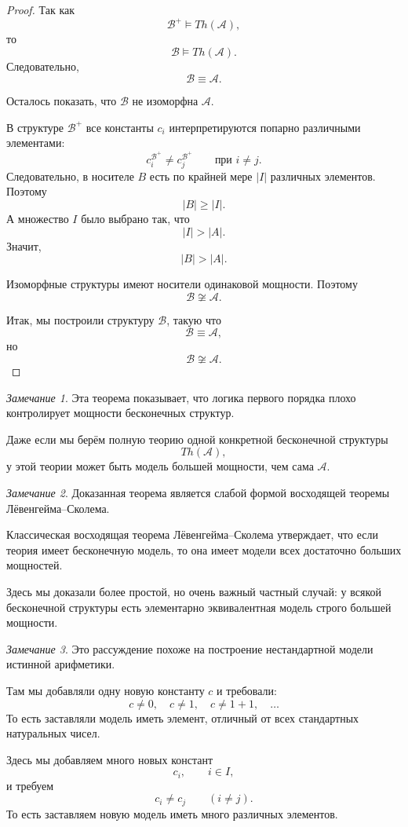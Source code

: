 \documentclass[12pt,a4paper,oneside,openany]{book}
\theoremstyle{definition}
\theoremstyle{plain}
\theoremstyle{remark}
\newtheorem{remark}{Замечание}[chapter]
\begin{document}
\begin{proof}
Так как
\[
\mathcal B^+\models Th(\mathcal A),
\]
то
\[
\mathcal B\models Th(\mathcal A).
\]
Следовательно,
\[
\mathcal B\equiv\mathcal A.
\]

Осталось показать, что $\mathcal B$ не изоморфна $\mathcal A$.

В структуре $\mathcal B^+$ все константы $c_i$ интерпретируются попарно различными элементами:
\[
c_i^{\mathcal B^+}\ne c_j^{\mathcal B^+}
\qquad
\text{при } i\ne j.
\]
Следовательно, в носителе $B$ есть по крайней мере $|I|$ различных элементов. Поэтому
\[
|B|\ge |I|.
\]
А множество $I$ было выбрано так, что
\[
|I|>|A|.
\]
Значит,
\[
|B|>|A|.
\]

Изоморфные структуры имеют носители одинаковой мощности. Поэтому
\[
\mathcal B\not\cong\mathcal A.
\]

Итак, мы построили структуру $\mathcal B$, такую что
\[
\mathcal B\equiv\mathcal A,
\]
но
\[
\mathcal B\not\cong\mathcal A.
\]
\end{proof}

\begin{remark}
Эта теорема показывает, что логика первого порядка плохо контролирует мощности бесконечных структур.

Даже если мы берём полную теорию одной конкретной бесконечной структуры
\[
Th(\mathcal A),
\]
у этой теории может быть модель большей мощности, чем сама $\mathcal A$.
\end{remark}

\begin{remark}
Доказанная теорема является слабой формой восходящей теоремы Лёвенгейма--Сколема.

Классическая восходящая теорема Лёвенгейма--Сколема утверждает, что если теория имеет бесконечную модель, то она имеет модели всех достаточно больших мощностей.

Здесь мы доказали более простой, но очень важный частный случай: у всякой бесконечной структуры есть элементарно эквивалентная модель строго большей мощности.
\end{remark}

\begin{remark}
Это рассуждение похоже на построение нестандартной модели истинной арифметики.

Там мы добавляли одну новую константу $c$ и требовали:
\[
c\ne 0,\quad c\ne 1,\quad c\ne 1+1,\quad \ldots
\]
То есть заставляли модель иметь элемент, отличный от всех стандартных натуральных чисел.

Здесь мы добавляем много новых констант
\[
c_i,\qquad i\in I,
\]
и требуем
\[
c_i\ne c_j
\qquad
(i\ne j).
\]
То есть заставляем новую модель иметь много различных элементов.
\end{remark}
\end{document}
